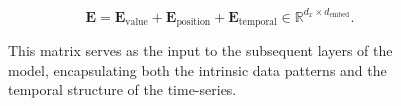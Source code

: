 \begin{figure}[!htbp]
{\begin{equation}
\mathbf{E} = \mathbf{E}_{\text{value}} + \mathbf{E}_{\text{position}} + \mathbf{E}_{\text{temporal}} \in \mathbb{R}^{d_x \times d_{\text{embed}}}.
\end{equation}

This matrix serves as the input to the subsequent layers of the model, encapsulating both the intrinsic data patterns and the temporal structure of the time-series.





}
\end{figure}
